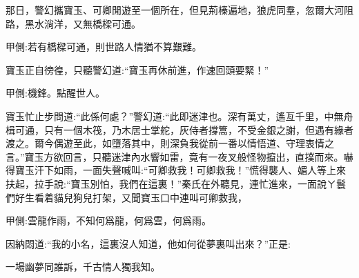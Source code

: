 \begin{parag}
    那日，警幻攜寶玉、可卿閒遊至一個所在，但見荊榛遍地，狼虎同羣，忽爾大河阻路，黑水淌洋，又無橋樑可通。\begin{note}甲側:若有橋樑可通，則世路人情猶不算艱難。\end{note}寶玉正自徬徨，只聽警幻道:“寶玉再休前進，作速回頭要緊！”\begin{note}甲側:機鋒。點醒世人。\end{note}寶玉忙止步問道:“此係何處？”警幻道:“此即迷津也。深有萬丈，遙亙千里，中無舟楫可通，只有一個木筏，乃木居士掌舵，灰侍者撐篙，不受金銀之謝，但遇有緣者渡之。爾今偶遊至此，如墮落其中，則深負我從前一番以情悟道、守理衷情之言。”寶玉方欲回言，只聽迷津內水響如雷，竟有一夜叉般怪物攛出，直撲而來。嚇得寶玉汗下如雨，一面失聲喊叫:“可卿救我！可卿救我！”慌得襲人、媚人等上來扶起，拉手說:“寶玉別怕，我們在這裏！”秦氏在外聽見，連忙進來，一面說ㄚ鬟們好生看着貓兒狗兒打架，又聞寶玉口中連叫可卿救我，\begin{note}甲側:雲龍作雨，不知何爲龍，何爲雲，何爲雨。\end{note}因納悶道:“我的小名，這裏沒人知道，他如何從夢裏叫出來？”正是:
\end{parag}


\begin{poem}
    \begin{pl}一場幽夢同誰訴，千古情人獨我知。\end{pl}
\end{poem}

